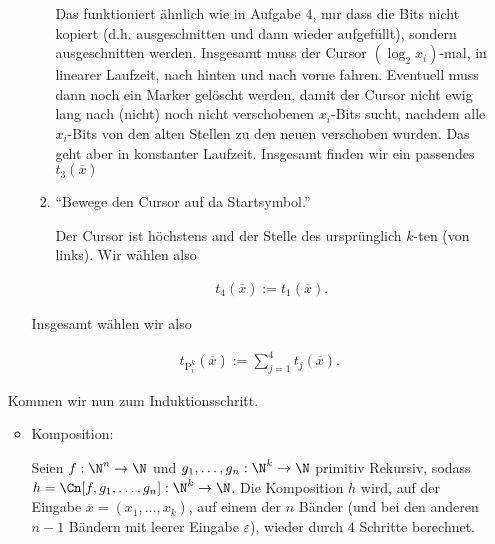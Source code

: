 \begin{solution}
\begin{enumerate}[wide, labelindent = 0pt]
\begin{itemize}
\begin{enumerate}[label = \arabic*.]
            Das funktioniert ähnlich wie in Aufgabe 4, nur dass die Bits nicht kopiert (d.h. ausgeschnitten und dann wieder aufgefüllt), sondern ausgeschnitten werden.
            Insgesamt muss der Cursor $(\log_2 x_i)$-mal, in linearer Laufzeit, nach hinten und nach vorne fahren.
            Eventuell muss dann noch ein Marker gelöscht werden, damit der Cursor nicht ewig lang nach (nicht) noch nicht verschobenen $x_i$-Bits sucht, nachdem alle $x_i$-Bits von den alten Stellen zu den neuen verschoben wurden.
            Das geht aber in konstanter Laufzeit.
            Insgesamt finden wir ein passendes $t_3(\overline x)$

            \item \enquote{Bewege den Cursor auf da Startsymbol.}

            Der Cursor ist höchstens and der Stelle des ursprünglich $k$-ten \textvisiblespace (von links).
            Wir wählen also

            \begin{align*}
                t_4(\overline x)
                :=
                t_1(\overline x).
            \end{align*}

        \end{enumerate}

        Insgesamt wählen wir also

        \begin{align*}
            t_{\operatorname P_i^k}(\overline x)
            :=
            \sum_{j=1}^4
                t_j(\overline x).
        \end{align*}

    \end{itemize}

    Kommen wir nun zum Induktionsschritt.

    \begin{itemize}

        \item Komposition:
        
        Seien $f: \N^n \to \N$ und $g_1, \dots, g_n: \N^k \to \N$ primitiv Rekursiv, sodass $h = \Cn[f, g_1, \dots, g_n]: \N^k \to \N$.
        Die Komposition $h$ wird, auf der Eingabe $\overline x = (x_1, \dots, x_k)$, auf einem der $n$ Bänder (und bei den anderen $n-1$ Bändern mit leerer Eingabe $\varepsilon$), wieder durch $4$ Schritte berechnet.

        \begin{enumerate}[label = \arabic*.]
            

\end{enumerate}
\end{itemize}
\end{enumerate}
\end{solution}
